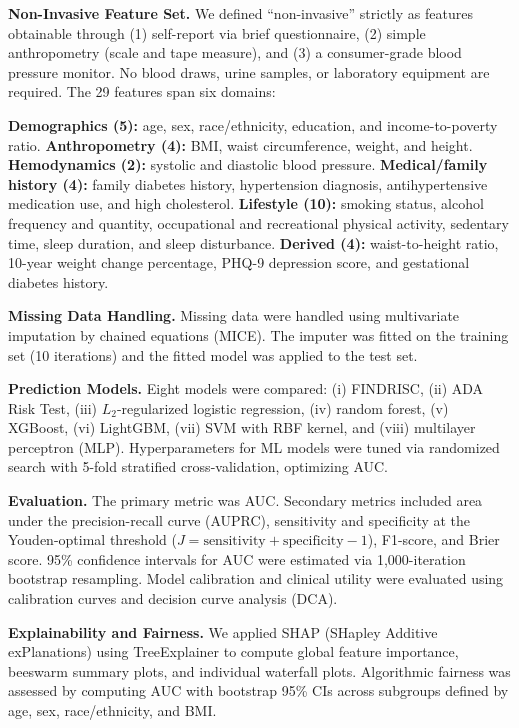 \documentclass{amia}
\begin{document}
\textbf{Non-Invasive Feature Set.}
We defined ``non-invasive'' strictly as features obtainable through (1) self-report via brief questionnaire, (2) simple anthropometry (scale and tape measure), and (3) a consumer-grade blood pressure monitor. No blood draws, urine samples, or laboratory equipment are required. The 29 features span six domains:

\textbf{Demographics (5):} age, sex, race/ethnicity, education, and income-to-poverty ratio. \textbf{Anthropometry (4):} BMI, waist circumference, weight, and height. \textbf{Hemodynamics (2):} systolic and diastolic blood pressure. \textbf{Medical/family history (4):} family diabetes history, hypertension diagnosis, antihypertensive medication use, and high cholesterol. \textbf{Lifestyle (10):} smoking status, alcohol frequency and quantity, occupational and recreational physical activity, sedentary time, sleep duration, and sleep disturbance. \textbf{Derived (4):} waist-to-height ratio, 10-year weight change percentage, PHQ-9 depression score, and gestational diabetes history.

\textbf{Missing Data Handling.}
Missing data were handled using multivariate imputation by chained equations (MICE).\cite{buuren2011mice} The imputer was fitted on the training set (10 iterations) and the fitted model was applied to the test set.

\textbf{Prediction Models.}
Eight models were compared: (i) FINDRISC,\cite{lindstrom2003} (ii) ADA Risk Test,\cite{bang2009} (iii) $L_2$-regularized logistic regression, (iv) random forest, (v) XGBoost,\cite{chen2016xgboost} (vi) LightGBM,\cite{ke2017lightgbm} (vii) SVM with RBF kernel, and (viii) multilayer perceptron (MLP). Hyperparameters for ML models were tuned via randomized search with 5-fold stratified cross-validation, optimizing AUC.

\textbf{Evaluation.}
The primary metric was AUC. Secondary metrics included area under the precision-recall curve (AUPRC), sensitivity and specificity at the Youden-optimal threshold ($J = \text{sensitivity} + \text{specificity} - 1$), F1-score, and Brier score. 95\% confidence intervals for AUC were estimated via 1,000-iteration bootstrap resampling. Model calibration and clinical utility were evaluated using calibration curves and decision curve analysis (DCA).\cite{vickers2006dca}

\textbf{Explainability and Fairness.}
We applied SHAP (SHapley Additive exPlanations)\cite{lundberg2017} using TreeExplainer to compute global feature importance, beeswarm summary plots, and individual waterfall plots. Algorithmic fairness was assessed by computing AUC with bootstrap 95\% CIs across subgroups defined by age, sex, race/ethnicity, and BMI.
\end{document}
